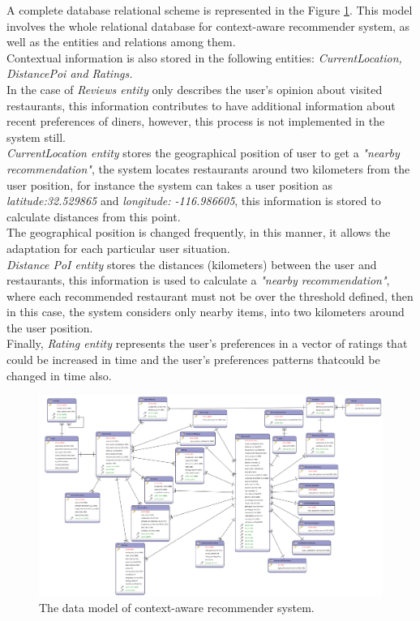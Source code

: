 A complete database relational scheme is represented in the 
Figure  \ref{fig:datamodel}. This model involves the whole relational 
database for context-aware recommender system, as well as 
the entities and relations among them. \\
Contextual information is also stored in the following entities:
\textit{CurrentLocation, DistancePoi and Ratings.} \\ 
In the case of \textit{Reviews entity}  only describes the user's 
opinion about visited restaurants, this information contributes to 
have additional information about recent preferences of diners, 
however, this process is not implemented in the system still. \\
\textit{CurrentLocation entity} stores the geographical position of
user to get a \textit{"nearby recommendation"}, the system locates
restaurants around two kilometers from the user position, for instance
the system can takes a user position as \textit{latitude:32.529865}
and \textit{longitude: -116.986605}, this information is stored to
calculate distances from this point. \\ The geographical position is
changed frequently, in this manner, it allows the adaptation for each
particular user situation. \\ \textit{Distance PoI entity} stores the
distances (kilometers) between the user and restaurants, this
information is used to calculate a \textit{"nearby recommendation"},
where each recommended restaurant must not be over the threshold defined, 
then in this case, the system considers only nearby items, into two kilometers 
around the user position.\\
Finally, \textit{Rating entity} represents the user's preferences  
in a vector of ratings that could be increased in time and  
the user's preferences patterns thatcould be changed in time also.
\begin{landscape} 
\begin{figure}[!h] 
\captionsetup{font=footnotesize}
\centering
\includegraphics[width=1.3\textwidth]{img/recomet.png}
\caption{The data model of context-aware recommender system.}
\label{fig:datamodel}    
\end{figure}
\end{landscape}

